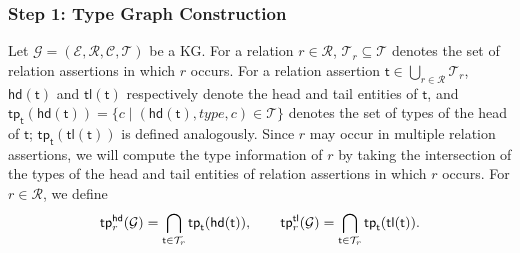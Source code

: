 \subsubsection{Step 1: Type Graph Construction}
 Let  $\mathcal G = (\mathcal{E,R,C,T})$ be a KG. For a  relation $r\in \mathcal{R}$, 
 $\mathcal T_r\subseteq \mathcal T$  denotes the set of  relation assertions in which $r$ occurs. For a  relation assertion $\mathsf t\in  \bigcup_{r \in \mathcal R}\mathcal T_r$, $\mathsf{hd}(\mathsf t)$ and $\mathsf{tl}( \mathsf t)$   respectively denote 
the head  and tail entities of $\mathsf t$, and $\mathsf{tp}_\mathsf t (\mathsf{hd}(\mathsf t)) = \{c \mid (\mathsf{hd}(\mathsf t), type, c) \in \mathcal T\}$ denotes the set of types of  the head   of $\mathsf t$; $\mathsf{tp}_{\mathsf t}(\mathsf{tl}( \mathsf t))$ is defined analogously. 
Since  $r$ may occur in multiple relation assertions, we will compute the type information of $r$ by taking the intersection of the types of the head and tail entities of relation assertions in which  $r$ occurs. %
For $r \in \mathcal R$, %
we define
\begin{equation*}
    \mathsf{tp}_{r}^{\mathsf{hd}}(\mathcal G) = \bigcap_{ \mathsf t \in \mathcal T_r} \mathsf{tp}_\mathsf t(\mathsf{hd}(\mathsf t)), \qquad \mathsf{tp}_{r}^{\mathsf{tl}}(\mathcal G) = \bigcap_{\mathsf t \in \mathcal T_r} \mathsf{tp}_\mathsf t(\mathsf{tl (t)}).\vspace{-0.1cm}
     \end{equation*}
